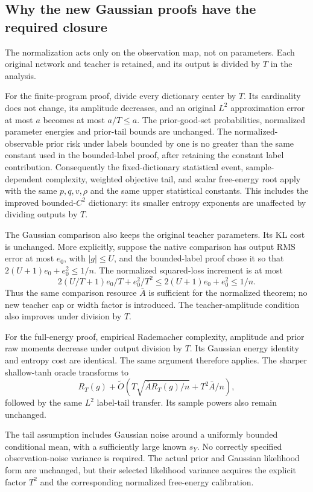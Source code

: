 \subsection{Why the new Gaussian proofs have the required closure}
The normalization acts only on the observation map, not on parameters. Each original network and teacher is retained, and its output is divided by $T$ in the analysis.

For the finite-program proof, divide every dictionary center by $T$. Its cardinality does not change, its amplitude decreases, and an original $L^2$ approximation error at most $a$ becomes at most $a/T\le a$. The prior-good-set probabilities, normalized parameter energies and prior-tail bounds are unchanged. The normalized-observable prior risk under labels bounded by one is no greater than the same constant used in the bounded-label proof, after retaining the constant label contribution. Consequently the fixed-dictionary statistical event, sample-dependent complexity, weighted objective tail, and scalar free-energy root apply with the same $p,q,v,\rho$ and the same upper statistical constants. This includes the improved bounded-$C^2$ dictionary: its smaller entropy exponents are unaffected by dividing outputs by $T$.

The Gaussian comparison also keeps the original teacher parameters. Its KL cost is unchanged. More explicitly, suppose the native comparison has output RMS error at most $e_0$, with $|g|\le U$, and the bounded-label proof chose it so that
$2(U+1)e_0+e_0^2\le1/n$. The normalized squared-loss increment is at most
\[
 2(U/T+1)e_0/T+e_0^2/T^2
 \le2(U+1)e_0+e_0^2\le1/n.
\]
Thus the same comparison resource $\bar A$ is sufficient for the normalized theorem; no new teacher cap or width factor is introduced. The teacher-amplitude condition also improves under division by $T$.

For the full-energy proof, empirical Rademacher complexity, amplitude and prior raw moments decrease under output division by $T$. Its Gaussian energy identity and entropy cost are identical. The same argument therefore applies. The sharper shallow-tanh oracle transforms to
\[
 R_T(g)+\widetilde O\left(
 T\sqrt{\bar A R_T(g)/n}+T^2\bar A/n\right),
\]
followed by the same $L^2$ label-tail transfer. Its sample powers also remain unchanged.

The tail assumption includes Gaussian noise around a uniformly bounded conditional mean, with a sufficiently large known $s_Y$. No correctly specified observation-noise variance is required. The actual prior and Gaussian likelihood form are unchanged, but their selected likelihood variance acquires the explicit factor $T^2$ and the corresponding normalized free-energy calibration.

